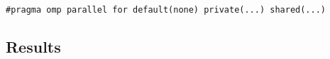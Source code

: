 \begin{lstlisting}
#pragma omp parallel for default(none) private(...) shared(...)
\end{lstlisting}

        
\subsection{Results}
\label{ssec:results}

